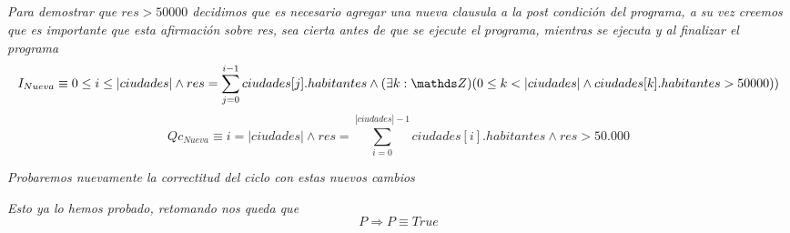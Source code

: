 \documentclass[10pt,a4paper]{article}
\begin{document}
	\setcounter{subsection}{1}
	\subsection{}
	\noindent\textit{Para demostrar que $res>50000$ decidimos que es necesario agregar una nueva clausula a la post condición del programa, a su vez creemos que es importante que esta afirmación sobre res, sea cierta antes de que se ejecute el programa, mientras se ejecuta y al finalizar el programa}
	\[I_{Nueva} \equiv 0 \leq i \leq |ciudades| \land res= \sum_{j=0}^{i-1} ciudades[j].habitantes \land (\exists k: \ent)(0 \leq k < |ciudades| \land 
	ciudades[k].habitantes > 50000)) \]
	\[Qc_{Nueva}\equiv i=\lvert ciudades\rvert \land  res= \sum_{i=0}^{|ciudades|-1} ciudades[i].habitantes \land  res >50.000 \]
	
	
	\noindent \textit{Probaremos nuevamente la correctitud del ciclo con estas nuevos cambios }
	
	\begin{demo1}
		\textit{Esto ya lo hemos probado, retomando nos queda que}
		\[P \Longrightarrow P \equiv True\]
	\end{demo1}
	
\end{document}
